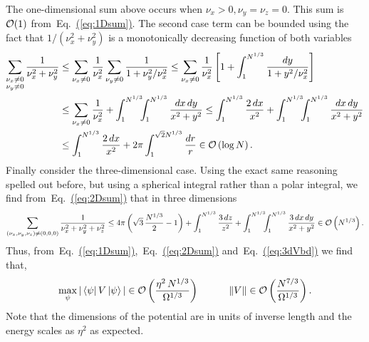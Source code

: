 \documentclass[superscriptaddress,aps,pra,nofootinbib,notitlepage,10pt,longbibliography]{revtex4-1}
\newcommand{\eq}[1]{Eq.~\hyperref[eq:#1]{(\ref*{eq:#1})}}
\def\bra#1{\mathinner{\langle{#1}|}}
\def\ket#1{\mathinner{|{#1}\rangle}}
\begin{document}
The one-dimensional sum above occurs when $\nu_x > 0,\nu_y=\nu_z = 0$.  This sum is ${\cal O}(1)$ from~\eq{1Dsum}. The second case term can be bounded using the fact that $1/(\nu_x^2 + \nu_y^2)$ is a monotonically decreasing function of both variables
\begin{align}
\label{eq:2Dsum}
\sum_{\substack{\nu_x \neq 0 \\ \nu_y \neq 0}} \frac{1}{\nu_x^2 + \nu_y^2}
%
& \le \sum_{\nu_x \neq 0}\frac{1}{\nu_x^2}\sum_{\nu_y\neq 0}\frac{1}{1+\nu_y^2/\nu_x^2}
%
\le \sum_{\nu_x\neq 0}\frac{1}{\nu_x^2}\left[1+\int_{1}^{N^{1/3}} \frac{dy}{1+y^2/\nu_x^2}\right]\\
%
& \le \sum_{\nu_x \neq 0} \frac{1}{\nu_x^2} + \int_{1}^{N^{1/3}} \!\!\! \int_{1}^{N^{1/3}}  \frac{dx \, dy}{x^2+y^2}
%
\le \int_1^{N^{1/3}} \frac{2 \, dx}{x^2}+\int_{1}^{N^{1/3}} \! \! \! \int_{1}^{N^{1/3}}  \frac{dx \, dy}{x^2+y^2} \nonumber\\
& \le \int_1^{N^{1/3}} \frac{2 \, dx}{x^2}+ 2\pi \int_1^{\sqrt{2} N^{1/3}} \frac{dr}{r}\in {\cal O}\left(\log N\right).\nonumber
\end{align} 
Finally consider the three-dimensional case. Using the exact same reasoning spelled out before, but using a spherical integral rather than a polar integral, we find from~\eq{2Dsum} that in three dimensions
\begin{equation}
\sum_{(\nu_x, \nu_y, \nu_z) \neq (0,0,0)} \frac{1}{\nu_x^2 + \nu_y^2 + \nu_z^2} 
 \leq 4\pi\left(\sqrt{3} \, \frac{N^{1/3}}{2} -1\right)+\int_{1}^{N^{1/3}} \frac{3 \, dz}{z^2} + \int_{1}^{N^{1/3}} \!\!\! \int_{1}^{N^{1/3}} \frac{3 \, dx \, dy}{x^2 +y^2} \in {\cal O} \left(N^{1/3}\right).
 \label{eq:3dVbd}
\end{equation}
Thus, from~\eq{1Dsum},~\eq{2Dsum} and~\eq{3dVbd} we find that,
\begin{equation}
\label{eq:v_bound}
\max_{\psi} | \bra{\psi} V\ket{\psi}| \in {\cal O}\left(\frac{\eta^2 \, N^{1/3}}{\Omega^{1/3}}\right)
%
\quad \quad \quad \left\| V \right\| \in {\cal O}\left(\frac{N^{7/3}}{\Omega^{1/3}}\right).
\end{equation}
Note that the dimensions of the potential are in units of inverse length and the energy scales as $\eta^2$ as expected.
\end{document}
